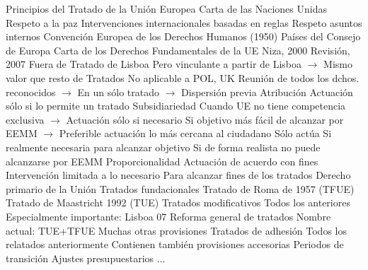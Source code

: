 \documentclass{nuevotema}
\begin{document}
\begin{esquemal}
	\1 
		\2 Principios del Tratado de la Unión Europea
			\3 Carta de las Naciones Unidas
				\4 Respeto a la paz
				\4 Intervenciones internacionales basadas en reglas
				\4 Respeto asuntos internos
			\3 Convención Europea de los Derechos Humanos (1950)
				\4 Países del Consejo de Europa
			\3 Carta de los Derechos Fundamentales de la UE
				\4 Niza, 2000
				\4 Revisión, 2007
				\4 Fuera de Tratado de Lisboa
				\4[] Pero vinculante a partir de Lisboa
				\4[] $\to$ Mismo valor que resto de Tratados
				\4 No aplicable a POL, UK
				\4 Reunión de todos los dchos. reconocidos
				\4[] $\to$ En un sólo tratado
				\4[] $\to$ Dispersión previa
			\3 Atribución
				\4 Actuación sólo si lo permite un tratado
			\3 Subsidiariedad
				\4 Cuando UE no tiene competencia exclusiva
				\4[] $\to$ Actuación sólo si necesario
				\4 Si objetivo más fácil de alcanzar por EEMM
				\4[] $\to$ Preferible actuación lo más cercana al ciudadano
				\4 Sólo actúa
				\4[] Si realmente necesaria para alcanzar objetivo
				\4[] Si de forma realista no puede alcanzarse por EEMM
			\3 Proporcionalidad
				\4 Actuación de acuerdo con fines
				\4 Intervención limitada a lo necesario
				\4[] Para alcanzar fines de los tratados
		\2 Derecho primario de la Unión
			\3 Tratados fundacionales
				\4 Tratado de Roma de 1957 (TFUE)
				\4 Tratado de Maastricht 1992 (TUE)
			\3 Tratados modificativos
				\4 Todos los anteriores
				\4 Especialmente importante: Lisboa 07
				\4[] Reforma general de tratados
				\4[] Nombre actual: TUE+TFUE
				\4[] Muchas otras provisiones
			\3 Tratados de adhesión
				\4 Todos los relatados anteriormente
				\4 Contienen también provisiones accesorias
				\4[] Periodos de transición
				\4[] Ajustes presupuestarios
				\4[] ...
			

\end{esquemal}
\end{document}
